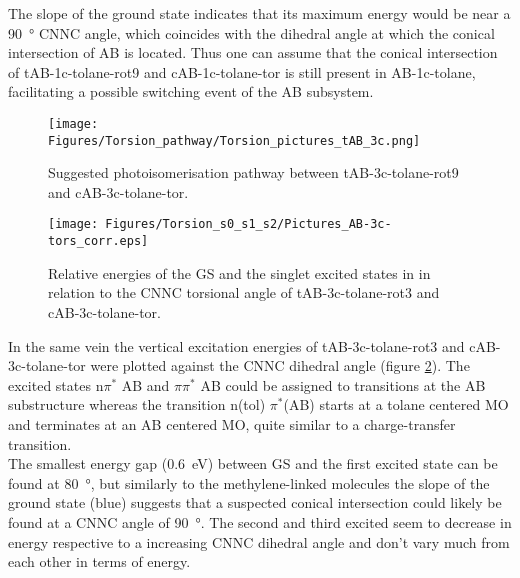 The slope of the ground state indicates that its maximum energy would be near a \SI{90}{\degree} CNNC angle, which coincides with the dihedral angle at which the conical intersection of AB is located.\cite{maximum-con-inter-AB} 
Thus one can assume that the conical intersection of tAB-1c-tolane-rot9 and cAB-1c-tolane-tor is still present in AB-1c-tolane, facilitating a possible switching event of the AB subsystem.
%
%
%
%
\begin{figure}[H]
    \centering
    \texttt{[image: Figures/Torsion\_pathway/Torsion\_pictures\_tAB\_3c.png]}
    \caption{Suggested photoisomerisation pathway between tAB-3c-tolane-rot9 and cAB-3c-tolane-tor.}
    \label{fig:tors_tAB-cAB-3c-pathway}
\end{figure}
%
%
\begin{figure}[H]
    \centering
    \texttt{[image: Figures/Torsion\_s0\_s1\_s2/Pictures\_AB-3c-tors\_corr.eps]}
    \caption{Relative energies of the GS and the singlet excited states in in relation to the CNNC torsional angle of tAB-3c-tolane-rot3 and cAB-3c-tolane-tor.}
    \label{fig:tors-tAB-cAB-3c}
\end{figure}
%
In the same vein the vertical excitation energies of tAB-3c-tolane-rot3 and cAB-3c-tolane-tor were plotted against the CNNC dihedral angle (figure \ref{fig:tors-tAB-cAB-3c}). 
The excited states n$\pi^{*}$ AB and $\pi\pi^{*}$ AB could be assigned to transitions at the AB substructure whereas the transition n(tol) $\pi^{*}$(AB) starts at a tolane centered MO and terminates at an AB centered MO, quite similar to a charge-transfer transition. \\
The smallest energy gap (\SI{0.6}{\eV}) between GS and the first excited state can be found at \SI{80}{\degree}, but similarly to the methylene-linked molecules the slope of the ground state (blue) suggests that a suspected conical intersection could likely be found at a CNNC angle of \SI{90}{\degree}. 
The second and third excited seem to decrease in energy respective to a increasing CNNC dihedral angle and don't vary much from each other in terms of energy.


